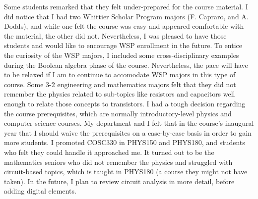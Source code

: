 \documentclass[../../main.tex]{subfiles}
\begin{document}
Some students remarked that they felt under-prepared for the course material.  I did notice that I had two Whittier Scholar Program majors (F. Capraro, and A. Dodds), and while one felt the course was easy and appeared comfortable with the material, the other did not.  Nevertheless, I was pleased to have those students and would like to encourage WSP enrollment in the future.  To entice the curiosity of the WSP majors, I included some cross-disciplinary examples during the Boolean algebra phase of the course.  Nevertheless, the pace will have to be relaxed if I am to continue to accomodate WSP majors in this type of course.  Some 3-2 engineering and mathematics majors felt that they did not remember the physics related to sub-topics like resistors and capacitors well enough to relate those concepts to transistors.  I had a tough decision regarding the course prerequisites, which are normally introductory-level physics and computer science courses.  My department and I felt that in the course's inaugural year that I should waive the prerequisites on a case-by-case basis in order to gain more students.  I promoted COSC330 in PHYS150 and PHYS180, and students who felt they could handle it approached me. It turned out to be the mathematics seniors who did not remember the physics and struggled with circuit-based topics, which is taught in PHYS180 (a course they might not have taken).  In the future, I plan to review circuit analysis in more detail, before adding digital elements. \\ \hspace{0.1cm}

\end{document}
